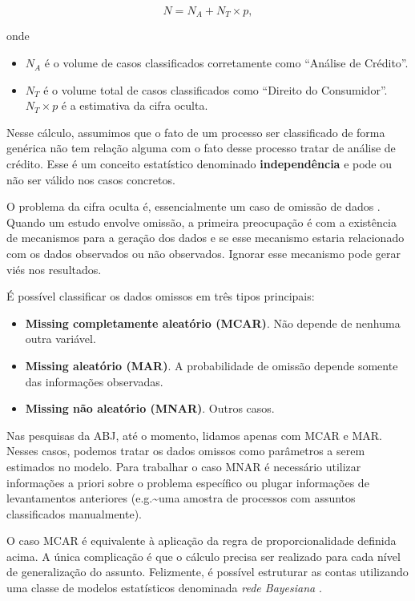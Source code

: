 \documentclass[]{report}
\providecommand{\tightlist}{%
  \setlength{\itemsep}{0pt}\setlength{\parskip}{0pt}}
\begin{document}
\[
N = N_A + N_T \times p,
\]

onde

\begin{itemize}
\tightlist
\item
  \(N_A\) é o volume de casos classificados corretamente como ``Análise
  de Crédito''.
\item
  \(N_T\) é o volume total de casos classificados como ``Direito do
  Consumidor''. \(N_T \times p\) é a estimativa da cifra oculta.
\end{itemize}

Nesse cálculo, assumimos que o fato de um processo ser classificado de
forma genérica não tem relação alguma com o fato desse processo tratar
de análise de crédito. Esse é um conceito estatístico denominado
\textbf{independência} \citep{degroot2005optimal} e pode ou não ser
válido nos casos concretos.

O problema da cifra oculta é, essencialmente um caso de omissão de dados
\citep{rubin2004multiple}. Quando um estudo envolve omissão, a primeira
preocupação é com a existência de mecanismos para a geração dos dados e
se esse mecanismo estaria relacionado com os dados observados ou não
observados. Ignorar esse mecanismo pode gerar viés nos resultados.

É possível classificar os dados omissos em três tipos principais:

\begin{itemize}
\tightlist
\item
  \textbf{Missing completamente aleatório (MCAR)}. Não depende de
  nenhuma outra variável.
\item
  \textbf{Missing aleatório (MAR)}. A probabilidade de omissão depende
  somente das informações observadas.
\item
  \textbf{Missing não aleatório (MNAR)}. Outros casos.
\end{itemize}

Nas pesquisas da ABJ, até o momento, lidamos apenas com MCAR e MAR.
Nesses casos, podemos tratar os dados omissos como parâmetros a serem
estimados no modelo. Para trabalhar o caso MNAR é necessário utilizar
informações a priori sobre o problema específico ou plugar informações
de levantamentos anteriores (e.g.\textasciitilde{}uma amostra de
processos com assuntos classificados manualmente).

O caso MCAR é equivalente à aplicação da regra de proporcionalidade
definida acima. A única complicação é que o cálculo precisa ser
realizado para cada nível de generalização do assunto. Felizmente, é
possível estruturar as contas utilizando uma classe de modelos
estatísticos denominada \emph{rede Bayesiana} \citep{cozman2000credal}.
\end{document}
